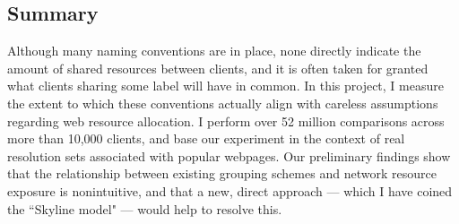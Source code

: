 \subsection{Summary}

Although many naming conventions are in place, none directly indicate the amount of shared resources
between clients, and it is often taken for granted what clients sharing some label will have in
common. In this project, I measure the extent to which these conventions actually align with
careless assumptions regarding web resource allocation. I perform over 52 million comparisons
across more than 10,000 clients, and base our experiment in the context of real resolution sets
associated with popular webpages. Our preliminary findings show that the relationship between
existing grouping schemes and network resource exposure is nonintuitive, and that a new, direct
approach --- which I have coined the ``Skyline model" --- would help to resolve this. 
